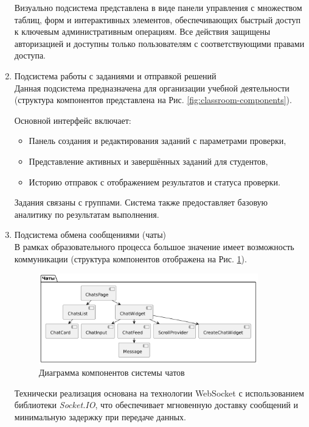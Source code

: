 \begin{enumerate}
  Визуально подсистема представлена в виде панели управления с множеством таблиц, форм и интерактивных элементов, обеспечивающих быстрый доступ к ключевым административным операциям. Все действия защищены авторизацией и доступны только пользователям с соответствующими правами доступа.

  \item Подсистема работы с заданиями и отправкой решений\\
  Данная подсистема предназначена для организации учебной деятельности (структура компонентов представлена на Рис. \ref{fig:classroom-components}). 
  
  Основной интерфейс включает:
  \begin{itemize}
    \item Панель создания и редактирования заданий с параметрами проверки,
    \item Представление активных и завершённых заданий для студентов,
    \item Историю отправок с отображением результатов и статуса проверки.
  \end{itemize}
  
  Задания связаны с группами. Система также предоставляет базовую аналитику по результатам выполнения.

  \item Подсистема обмена сообщениями (чаты)\\
  В рамках образовательного процесса большое значение имеет возможность коммуникации (структура компонентов отображена на Рис. \ref{fig:chat-components}).
    
  \begin{figure}[h]
    \centering
    \includegraphics[width=0.9\textwidth]{static/diagrams/ChatsComponentDiagram.png}
    \caption{Диаграмма компонентов системы чатов}
    \label{fig:chat-components}
  \end{figure}
    
  Технически реализация основана на технологии WebSocket с использованием библиотеки \textit{Socket.IO}, что обеспечивает мгновенную доставку сообщений и минимальную задержку при передаче данных.
  

\end{enumerate}
